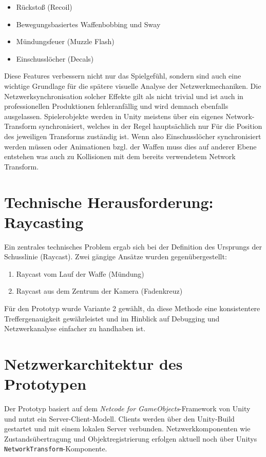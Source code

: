 \begin{itemize}
  \item Rückstoß (Recoil)
  \item Bewegungsbasiertes Waffenbobbing und Sway
  \item Mündungsfeuer (Muzzle Flash)
  \item Einschusslöcher (Decals)
\end{itemize}

Diese Features verbessern nicht nur das Spielgefühl, sondern sind auch eine wichtige Grundlage für die spätere visuelle Analyse der Netzwerkmechaniken. Die Netzwerksynchronisation solcher Effekte gilt als nicht trivial und ist auch in professionellen Produktionen fehleranfällig und wird demnach ebenfalls ausgelassen.
Spielerobjekte werden in Unity meistens über ein eigenes Network-Transform synchronisiert, welches in der Regel hauptsächlich nur Für die Position des jeweiligen Transforms zuständig ist. Wenn also Einschusslöcher synchronisiert werden müssen oder Animationen bzgl. der Waffen muss dies auf anderer Ebene entstehen was auch zu Kollisionen mit dem bereits verwendetem Network Transform. 

\section{Technische Herausforderung: Raycasting}
Ein zentrales technisches Problem ergab sich bei der Definition des Ursprungs der Schusslinie (Raycast). Zwei gängige Ansätze wurden gegenübergestellt:

\begin{enumerate}
  \item Raycast vom Lauf der Waffe (Mündung)
  \item Raycast aus dem Zentrum der Kamera (Fadenkreuz)
\end{enumerate}

Für den Prototyp wurde Variante 2 gewählt, da diese Methode eine konsistentere Treffergenauigkeit gewährleistet und im Hinblick auf Debugging und Netzwerkanalyse einfacher zu handhaben ist.

\section{Netzwerkarchitektur des Prototypen}
Der Prototyp basiert auf dem \textit{Netcode for GameObjects}-Framework von Unity und nutzt ein Server-Client-Modell. Clients werden über den Unity-Build gestartet und mit einem lokalen Server verbunden. Netzwerkkomponenten wie Zustandsübertragung und Objektregistrierung erfolgen aktuell noch über Unitys \texttt{NetworkTransform}-Komponente.

